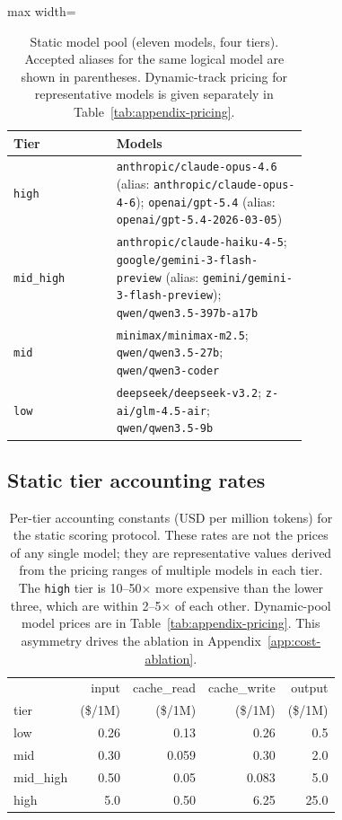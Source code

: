 \begin{table}[ht]
\centering
\small
\caption{Static model pool (eleven models, four tiers). Accepted aliases for
the same logical model are shown in parentheses. Dynamic-track pricing for
representative models is given separately in
Table~\ref{tab:appendix-pricing}.}
\label{tab:appendix-model-pool}
\begin{adjustbox}{max width=\linewidth}
\begin{tabular}{lp{0.65\linewidth}}
\toprule
Tier & Models \\
\midrule
\texttt{high}     & \texttt{anthropic/claude-opus-4.6} (alias:
                     \texttt{anthropic/claude-opus-4-6});
                     \texttt{openai/gpt-5.4} (alias:
                     \texttt{openai/gpt-5.4-2026-03-05}) \\
\texttt{mid\_high} & \texttt{anthropic/claude-haiku-4-5};
                     \texttt{google/gemini-3-flash-preview} (alias:
                     \texttt{gemini/gemini-3-flash-preview});
                     \texttt{qwen/qwen3.5-397b-a17b} \\
\texttt{mid}      & \texttt{minimax/minimax-m2.5};
                     \texttt{qwen/qwen3.5-27b};
                     \texttt{qwen/qwen3-coder} \\
\texttt{low}      & \texttt{deepseek/deepseek-v3.2};
                     \texttt{z-ai/glm-4.5-air};
                     \texttt{qwen/qwen3.5-9b} \\
\bottomrule
\end{tabular}
\end{adjustbox}
\end{table}

\subsection{Static tier accounting rates}
\label{app:static-tier-rates}

\begin{table}[ht]
\centering
\small
\begin{tabular}{lrrrr}
\toprule
 & input & cache\_read & cache\_write & output \\
tier & (\$/1M) & (\$/1M) & (\$/1M) & (\$/1M) \\
\midrule
low & 0.26 & 0.13 & 0.26 & 0.5 \\
mid & 0.30 & 0.059 & 0.30 & 2.0 \\
mid\_high & 0.50 & 0.05 & 0.083 & 5.0 \\
high & 5.0 & 0.50 & 6.25 & 25.0 \\
\bottomrule
\end{tabular}
\caption{Per-tier accounting constants (USD per million tokens) for the static
scoring protocol. These rates are not the prices of any single model; they are
representative values derived from the pricing ranges of multiple models in
each tier. The \texttt{high} tier is 10--50$\times$ more expensive than
the lower three, which are within 2--5$\times$ of each other. Dynamic-pool
model prices are in Table~\ref{tab:appendix-pricing}. This asymmetry drives
the ablation in Appendix~\ref{app:cost-ablation}.}
\label{tab:pricing}
\end{table}

